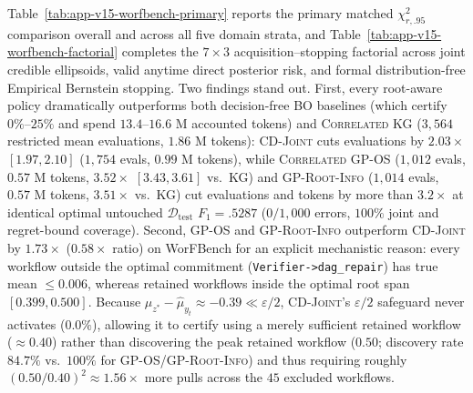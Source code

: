 \documentclass{article}
\theoremstyle{plain}
\theoremstyle{definition}
\begin{document}
Table~\ref{tab:app-v15-worfbench-primary} reports the primary matched $\chi^2_{r,.95}$ comparison overall and across all five domain strata, and Table~\ref{tab:app-v15-worfbench-factorial} completes the $7\times 3$ acquisition--stopping factorial across joint credible ellipsoids, valid anytime direct posterior risk, and formal distribution-free Empirical Bernstein stopping. Two findings stand out. First, every root-aware policy dramatically outperforms both decision-free BO baselines (which certify $0\%$--$25\%$ and spend $13.4$--$16.6\text{ M}$ accounted tokens) and \textsc{Correlated KG} ($3{,}564$ restricted mean evaluations, $1.86\text{ M}$ tokens): \textsc{CD-Joint} cuts evaluations by $2.03\times$ $[1.97,2.10]$ ($1{,}754$ evals, $0.99\text{ M}$ tokens), while \textsc{Correlated GP-OS} ($1{,}012$ evals, $0.57\text{ M}$ tokens, $3.52\times$ $[3.43,3.61]$ vs.\ KG) and \textsc{GP-Root-Info} ($1{,}014$ evals, $0.57\text{ M}$ tokens, $3.51\times$ vs.\ KG) cut evaluations and tokens by more than $3.2\times$ at identical optimal untouched $\mathcal D_{\mathrm{test}}$ $F_1=.5287$ ($0/1{,}000$ errors, $100\%$ joint and regret-bound coverage). Second, \textsc{GP-OS} and \textsc{GP-Root-Info} outperform \textsc{CD-Joint} by $1.73\times$ ($0.58\times$ ratio) on WorFBench for an explicit mechanistic reason: every workflow outside the optimal commitment (\texttt{Verifier->dag\_repair}) has true mean $\le 0.006$, whereas retained workflows inside the optimal root span $[0.399,0.500]$. Because $\hat\mu_{z^*}-\hat\mu_{y_t}\approx -0.39\ll\varepsilon/2$, \textsc{CD-Joint}'s $\varepsilon/2$ safeguard never activates ($0.0\%$), allowing it to certify using a merely sufficient retained workflow ($\approx 0.40$) rather than discovering the peak retained workflow ($0.50$; discovery rate $84.7\%$ vs.\ $100\%$ for \textsc{GP-OS}/\textsc{GP-Root-Info}) and thus requiring roughly $(0.50/0.40)^2\approx 1.56\times$ more pulls across the $45$ excluded workflows.
\end{document}
